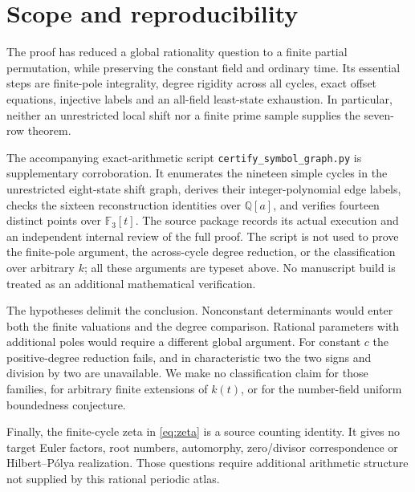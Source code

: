 \section{Scope and reproducibility}\label{sec:scope}
The proof has reduced a global rationality question to a finite
partial permutation, while preserving the constant field and
ordinary time. Its essential steps are finite-pole integrality,
degree rigidity across all cycles, exact offset equations,
injective labels and an all-field least-state exhaustion.
In particular, neither an unrestricted local shift nor a finite
prime sample supplies the seven-row theorem.

The accompanying exact-arithmetic script
\texttt{certify\_symbol\_graph.py} is supplementary corroboration.
It enumerates the nineteen simple cycles in the unrestricted
eight-state shift graph, derives their integer-polynomial edge
labels, checks the sixteen reconstruction identities over
$\mathbb Q[a]$, and verifies fourteen distinct points over
$\mathbb F_3[t]$. The source package records its actual execution
and an independent internal review of the full proof. The script
is not used to prove the finite-pole argument, the across-cycle
degree reduction, or the classification over arbitrary $k$;
all these arguments are typeset above. No manuscript build is
treated as an additional mathematical verification.

The hypotheses delimit the conclusion. Nonconstant determinants
would enter both the finite valuations and the degree comparison.
Rational parameters with additional poles would require a different
global argument. For constant $c$ the positive-degree reduction
fails, and in characteristic two the two signs and division by
two are unavailable. We make no classification claim for those
families, for arbitrary finite extensions of $k(t)$, or for the
number-field uniform boundedness conjecture.

Finally, the finite-cycle zeta in \eqref{eq:zeta} is a source
counting identity. It gives no target Euler factors, root numbers,
automorphy, zero/divisor correspondence or Hilbert--P\'olya
realization. Those questions require additional arithmetic
structure not supplied by this rational periodic atlas.
